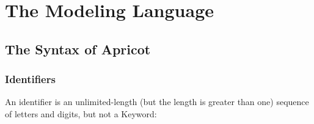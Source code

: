 \documentclass{WileySix}
\begin{document}









 \begin{introduction}
 \end{introduction}



\part[The Modeling Language]{The Modeling Language}

\chapter[The Syntax of Apricot]{The Syntax of Apricot}

\section{Identifiers} 
An identifier is an unlimited-length (but the length is greater than one) sequence of letters and digits, but not a Keyword:
\end{document}
